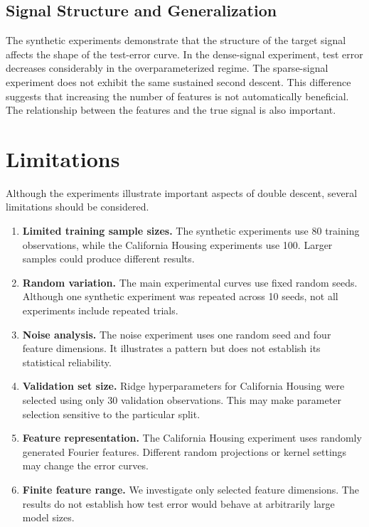 \documentclass[11pt,a4paper]{article}
\begin{document}
\subsection{Signal Structure and Generalization}
The synthetic experiments demonstrate that
the structure of the target signal affects
the shape of the test-error curve.
In the dense-signal experiment, test error
decreases considerably in the
overparameterized regime.
The sparse-signal experiment does not
exhibit the same sustained second descent.
This difference suggests that increasing
the number of features is not automatically
beneficial. The relationship between the
features and the true signal is also
important.

\section{Limitations}
Although the experiments illustrate
important aspects of double descent,
several limitations should be considered.
\begin{enumerate}
    \item \textbf{Limited training sample sizes.}
    The synthetic experiments use 80
    training observations, while the
    California Housing experiments use 100.
    Larger samples could produce
    different results.
    \item \textbf{Random variation.}
    The main experimental curves use
    fixed random seeds. Although one
    synthetic experiment was repeated
    across 10 seeds, not all experiments
    include repeated trials.
    \item \textbf{Noise analysis.}
    The noise experiment uses one
    random seed and four feature
    dimensions. It illustrates a
    pattern but does not establish
    its statistical reliability.
    \item \textbf{Validation set size.}
    Ridge hyperparameters for California
    Housing were selected using only
    30 validation observations.
    This may make parameter selection
    sensitive to the particular split.
    \item \textbf{Feature representation.}
    The California Housing experiment
    uses randomly generated Fourier
    features. Different random
    projections or kernel settings
    may change the error curves.
    \item \textbf{Finite feature range.}
    We investigate only selected
    feature dimensions. The results
    do not establish how test error
    would behave at arbitrarily
    large model sizes.
\end{enumerate}
\end{document}
